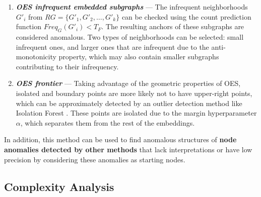 \documentclass[pdflatex,sn-mathphys-num]{sn-jnl}%
\theoremstyle{thmstyleone}%
\theoremstyle{thmstyletwo}%
\theoremstyle{thmstylethree}%
\begin{document}
\begin{enumerate}[label=(\alph*)]
    \item \textbf{\textit{OES infrequent embedded subgraphs}} --- The infrequent neighborhoods $G'_i$ from $RG=\{G'_1, G'_2, \dots, G'_k\}$ can be checked using the count prediction function $Freq_G(G'_i) < T_F$. The resulting anchors of these subgraphs are considered anomalous. Two types of neighborhoods can be selected: small infrequent ones, and larger ones that are infrequent due to the anti-monotonicity property, which may also contain smaller subgraphs contributing to their infrequency.
    \item \textbf{\textit{OES frontier}} --- Taking advantage of the geometric properties of OES, isolated and boundary points are more likely not to have upper-right points, which can be approximately detected by an outlier detection method like Isolation Forest \cite{liu2008isolation}. These points are isolated due to the margin hyperparameter $\alpha$, which separates them from the rest of the embeddings.
\end{enumerate}

In addition, this method can be used to find anomalous structures of \textbf{node anomalies detected by other methods} that lack interpretations or have low precision by considering these anomalies as starting nodes.

\subsection{Complexity Analysis}
\label{sec:complexity}
\end{document}
